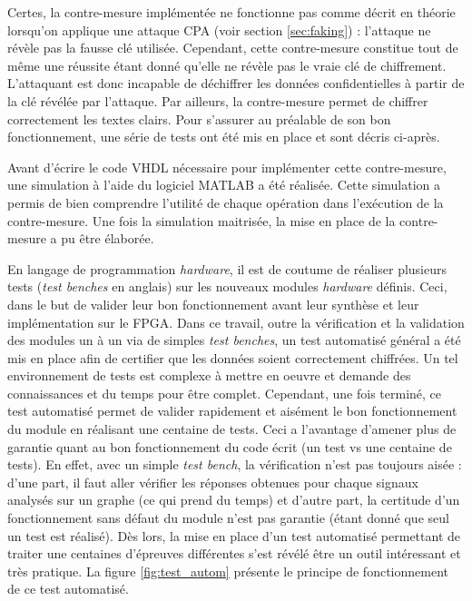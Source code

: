 \documentclass[oneside]{book}
\begin{document}
Certes, la contre-mesure implémentée ne fonctionne pas comme décrit en théorie lorsqu'on applique une attaque CPA (voir section \ref{sec:faking}) : l'attaque ne révèle pas la fausse clé utilisée. Cependant, cette contre-mesure constitue tout de même une réussite étant donné qu'elle ne révèle pas le vraie clé de chiffrement. L'attaquant est donc incapable de déchiffrer les données confidentielles à partir de la clé révélée par l'attaque. Par ailleurs, la contre-mesure permet de chiffrer correctement les textes clairs. Pour s'assurer au préalable de son bon fonctionnement, une série de tests ont été mis en place et sont décris ci-après.

\hspace{-0.5cm}Avant d'écrire le code VHDL nécessaire pour implémenter cette contre-mesure, une simulation à l'aide du logiciel MATLAB a été réalisée. Cette simulation a permis de bien comprendre l'utilité de chaque opération dans l'exécution de la contre-mesure. Une fois la simulation maitrisée, la mise en place de la contre-mesure a pu être élaborée. 

\hspace{-0.5cm}En langage de programmation \textit{hardware}, il est de coutume de réaliser plusieurs tests (\textit{test benches} en anglais) sur les nouveaux modules \textit{hardware} définis. Ceci, dans le but de valider leur bon fonctionnement avant leur synthèse et leur implémentation sur le FPGA. Dans ce travail, outre la vérification et la validation des modules un à un via de simples \textit{test benches}, un test automatisé général a été mis en place afin de certifier que les données soient correctement chiffrées. Un tel environnement de tests est complexe à mettre en oeuvre et demande des connaissances et du temps pour être complet. Cependant, une fois terminé, ce test automatisé permet de valider rapidement et aisément le bon fonctionnement du module en réalisant une centaine de tests. Ceci a l'avantage d'amener plus de garantie quant au bon fonctionnement du code écrit (un test vs une centaine de tests). En effet, avec un simple \textit{test bench}, la vérification n'est pas toujours aisée : d'une part, il faut aller vérifier les réponses obtenues pour chaque signaux analysés sur un graphe (ce qui prend du temps) et d'autre part, la certitude d'un fonctionnement sans défaut du module n'est pas garantie (étant donné que seul un test est réalisé). Dès lors, la mise en place d'un test automatisé permettant de traiter une centaines d'épreuves différentes s'est révélé être un outil intéressant et très pratique. La figure \ref{fig:test_autom} présente le principe de fonctionnement de ce test automatisé.
\end{document}
